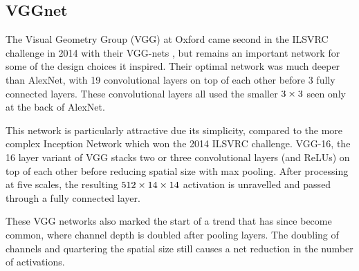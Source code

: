 
\subsection{VGGnet}
The Visual Geometry Group (VGG) at Oxford came second in the ILSVRC challenge in
2014 with their VGG-nets \cite{simonyan_very_2014}, but remains an important
network for some of the design choices it inspired. Their optimal
network was much deeper than AlexNet, with 19 convolutional layers on top of
each other before 3 fully connected layers. These convolutional layers all used
the smaller $3\times 3$ seen only at the back of AlexNet.

This network is particularly attractive due its simplicity, compared to the
more complex Inception Network \cite{szegedy_going_2015} which won the 2014
ILSVRC challenge. VGG-16, the 16 layer variant of VGG stacks two or three
convolutional layers (and ReLUs) on top of each other before reducing spatial
size with max pooling. After processing at five scales, the resulting $512 \times 14
\times 14$ activation is unravelled and passed through a fully connected layer.

These VGG networks also marked the start of a trend that has since become
common, where channel depth is doubled after pooling layers. The doubling of
channels and quartering the spatial size still causes a net reduction in the
number of activations.

